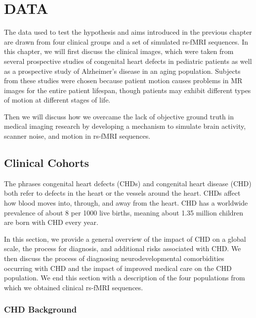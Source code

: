 \chapter{DATA}
\label{ch:data}

The data used to test the hypothesis and aims introduced in the previous chapter are drawn from four clinical groups and  a set of simulated rs-fMRI sequences. In this chapter, we will first discuss the clinical images, which were taken from several prospective studies of congenital heart defects in pediatric patients as well as a prospective study of Alzheimer's disease in an aging population. Subjects from these studies were chosen because patient motion causes problems in MR images for the entire patient lifespan, though patients may exhibit different types of motion at different stages of life. 

Then we will discuss how we overcame the lack of objective ground truth in medical imaging research by developing a mechanism to simulate brain activity, scanner noise, and motion in rs-fMRI sequences.

\section{Clinical Cohorts}

The phrases congenital heart defects (CHDs) and congenital heart disease (CHD) both refer to defects in the heart or the vessels around the heart. CHDs affect how blood moves into, through, and away from the heart. 
CHD has a worldwide prevalence of about 8 per 1000 live births, meaning about 1.35 million children are born with CHD every year. %

In this section, we provide a general overview of the impact of CHD on a global scale, the process for diagnosis, and additional risks associated with CHD. We then discuss the process of diagnosing neurodevelopmental comorbidities occurring with CHD and the impact of improved medical care on the CHD population. We end this section with a description of the four populations from which we obtained clinical rs-fMRI sequences.


\subsection{CHD Background}

